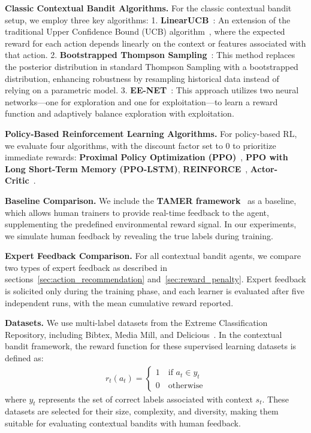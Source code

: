 \textbf{Classic Contextual Bandit Algorithms.}  
For the classic contextual bandit setup, we employ three key algorithms:  
1. \textbf{LinearUCB}~\citep{li2010contextual}: An extension of the traditional Upper Confidence Bound (UCB) algorithm~\citep{auer2002using}, where the expected reward for each action depends linearly on the context or features associated with that action.  
2. \textbf{Bootstrapped Thompson Sampling}~\citep{kaptein2014thompson}: This method replaces the posterior distribution in standard Thompson Sampling with a bootstrapped distribution, enhancing robustness by resampling historical data instead of relying on a parametric model.  
3. \textbf{EE-NET}~\citep{ban2021ee}: This approach utilizes two neural networks—one for exploration and one for exploitation—to learn a reward function and adaptively balance exploration with exploitation.

\textbf{Policy-Based Reinforcement Learning Algorithms.}  
For policy-based RL, we evaluate four algorithms, with the discount factor set to $0$ to prioritize immediate rewards:  
\textbf{Proximal Policy Optimization (PPO)}~\citep{schulman2017proximal},
\textbf{PPO with Long Short-Term Memory (PPO-LSTM)}, \textbf{REINFORCE}~\citep{williams1992simple}, \textbf{Actor-Critic}~\citep{pmlr-v80-haarnoja18b}.

\textbf{Baseline Comparison.}  
We include the \textbf{TAMER framework}~\citep{knox2009interactively} as a baseline, which allows human trainers to provide real-time feedback to the agent, supplementing the predefined environmental reward signal. In our experiments, we simulate human feedback by revealing the true labels during training.

\textbf{Expert Feedback Comparison.}  
For all contextual bandit agents, we compare two types of expert feedback as described in sections~\ref{sec:action_recommendation} and~\ref{sec:reward_penalty}. Expert feedback is solicited only during the training phase, and each learner is evaluated after five independent runs, with the mean cumulative reward reported.

\textbf{Datasets.}  
We use multi-label datasets from the Extreme Classification Repository, including Bibtex, Media Mill, and Delicious~\citep{Bhatia16}. In the contextual bandit framework, the reward function for these supervised learning datasets is defined as:
\begin{align}
r_t(a_t) = \begin{cases}
    1\quad \text{if } a_t \in y_t \\
    0 \quad \text{otherwise}
\end{cases}
\end{align}
where $y_t$ represents the set of correct labels associated with context $s_t$. These datasets are selected for their size, complexity, and diversity, making them suitable for evaluating contextual bandits with human feedback.

